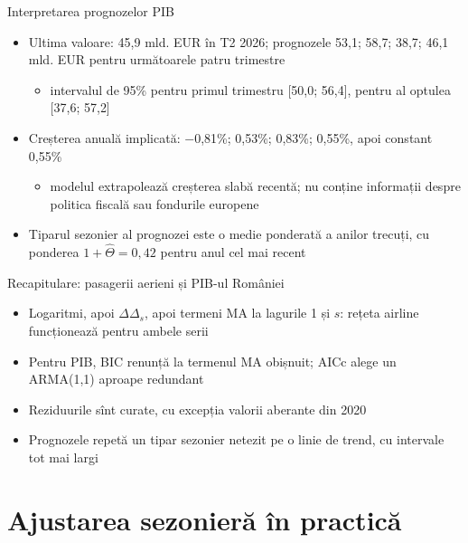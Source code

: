 \begin{frame}{Interpretarea prognozelor PIB}
\itemsize{\small}
\begin{itemize}
    \item Ultima valoare: 45{,}9 mld. EUR în T2 2026; prognozele 53{,}1; 58{,}7; 38{,}7; 46{,}1 mld. EUR pentru următoarele patru trimestre
    \begin{itemize}
        \item intervalul de 95\% pentru primul trimestru [50{,}0; 56{,}4], pentru al optulea [37{,}6; 57{,}2]
    \end{itemize}
    \item Creșterea anuală implicată: \ensuremath{-}0{,}81\%; 0{,}53\%; 0{,}83\%; 0{,}55\%, apoi constant 0{,}55\%
    \begin{itemize}
        \item modelul extrapolează creșterea slabă recentă; nu conține informații despre politica fiscală sau fondurile europene
    \end{itemize}
    \item Tiparul sezonier al prognozei este o medie ponderată a anilor trecuți, cu ponderea $1 + \hat\Theta = 0{,}42$ pentru anul cel mai recent
\end{itemize}
\end{frame}

\begin{frame}{Recapitulare: pasagerii aerieni și PIB-ul României}
\itemsize{\small}
\begin{itemize}
    \item Logaritmi, apoi $\Delta\Delta_s$, apoi termeni MA la lagurile 1 și $s$: rețeta airline funcționează pentru ambele serii
    \item Pentru PIB, BIC renunță la termenul MA obișnuit; AICc alege un ARMA(1,1) aproape redundant
    \item Reziduurile sînt curate, cu excepția valorii aberante din 2020
    \item Prognozele repetă un tipar sezonier netezit pe o linie de trend, cu intervale tot mai largi
\end{itemize}
\end{frame}


\section{Ajustarea sezonieră în practică}

